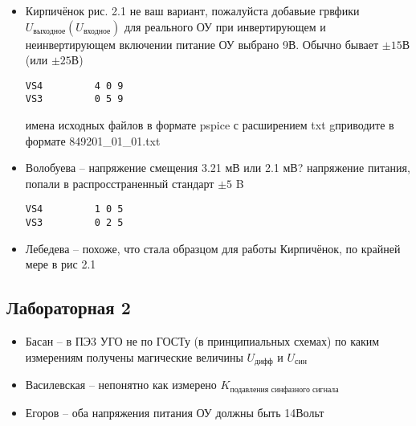 \begin{itemize}
\item 
	Кирпичёнок рис. 2.1 не ваш вариант, пожалуйста добавьие грвфики  $U_\text{выходное}(U_\text{входное})$ для реального ОУ при инвертирующем и неинвертирующем включении
	питание ОУ выбрано 9В.  Обычно бывает $\pm 15В$ (или $\pm25В$) 
\begin{verbatim}
VS4         4 0 9
VS3         0 5 9
\end{verbatim}
имена  исходных файлов в формате pspice с расширением txt gприводите в формате 849201\_01\_01.txt

\item 
	Волобуева -- напряжение смещения 3.21 мВ или 2.1 мВ? 
напряжение питания, попали в распросстраненный стандарт $\pm5$ B
\begin{verbatim}
VS4         1 0 5
VS3         0 2 5
\end{verbatim}

\item 
	Лебедева -- похоже, что стала образцом для работы Кирпичёнок, по крайней мере в рис 2.1

\end{itemize}

\subsection*{Лабораторная 2}
\begin{itemize}
	\item Басан -- в ПЭ3  УГО не по ГОСТу (в принципиальных схемах)
по каким измерениям получены магические
величины $U_\text{дифф}$ и $U_\text{син}$
\item Василевская -- непонятно как измерено
$K_\text{подавления синфазного сигнала}$
\item Егоров -- оба напряжения питания ОУ должны быть 14Вольт

\end{itemize}


